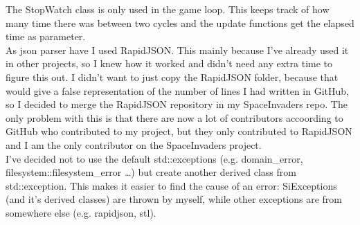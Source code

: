 \documentclass{article}
\begin{document}
    The StopWatch class is only used in the game loop. This keeps track of how many time there was between two cycles and the update functions get the elapsed time as parameter. \\
    As json parser have I used RapidJSON. This mainly because I've already used it in other projects, so I knew how it worked and didn't need any extra time to figure this out. I didn't want to just copy the RapidJSON folder, because that would give a false representation of the number of lines I had written in GitHub, so I decided to merge the RapidJSON repository in my SpaceInvaders repo. The only problem with this is that there are now a lot of contributors accoording to GitHub who contributed to my project, but they only contributed to RapidJSON and I am the only contributor on the SpaceInvaders project. \\
    I've decided not to use the default std::exceptions (e.g. domain_error, filesystem::filesystem_error \ldots) but create another derived class from std::exception. This makes it easier to find the cause of an error: SiExceptions (and it's derived classes) are thrown by myself, while other exceptions are from somewhere else (e.g. rapidjson, stl).
\end{document}
